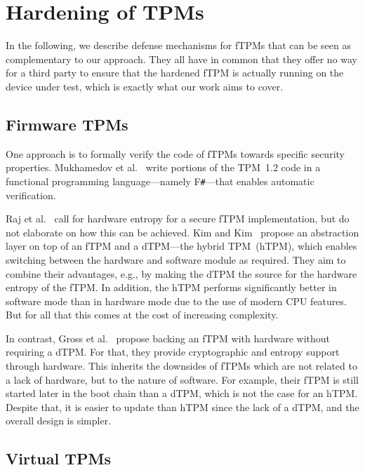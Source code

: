 \section{Hardening of TPMs}

In the following, we describe defense mechanisms for fTPMs that can be seen as complementary to our approach.
They all have in common that they offer no way for a third party to ensure that the hardened fTPM is actually running on the device under test, which is exactly what our work aims to cover.

\subsection{Firmware TPMs}

One approach is to formally verify the code of fTPMs towards specific security properties.
Mukhamedov et al.~\cite{Mukhamedov2013} write portions of the TPM~1.2 code in a functional programming language---namely F\texttt{\#}---that enables automatic verification.

Raj et al.~\cite{Raj2015} call for hardware entropy for a secure \ac{fTPM} implementation, but do not elaborate on how this can be achieved.
Kim and Kim~\cite{Kim2019} propose an abstraction layer on top of an \ac{fTPM} and a \ac{dTPM}---the hybrid TPM~(hTPM), which enables switching between the hardware and software module as required.
They aim to combine their advantages, e.g., by making the dTPM the source for the hardware entropy of the fTPM\@.
In addition, the hTPM performs significantly better in software mode than in hardware mode due to the use of modern CPU features.
But for all that this comes at the cost of increasing complexity.

In contrast, Gross et al.~\cite{Gross2021} propose backing an \ac{fTPM} with hardware without requiring a \ac{dTPM}.
For that, they provide cryptographic and entropy support through hardware.
This inherits the downsides of \acp{fTPM} which are not related to a lack of hardware, but to the nature of software.
For example, their \ac{fTPM} is still started later in the boot chain than a \ac{dTPM}, which is not the case for an hTPM\@.
Despite that, it is easier to update than hTPM since the lack of a dTPM, and the overall design is simpler.

\subsection{Virtual TPMs}

